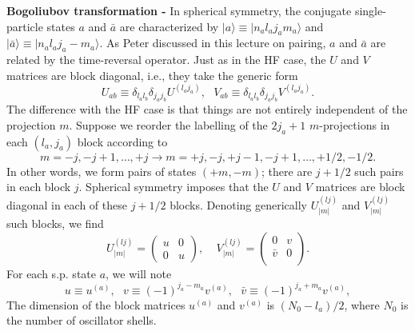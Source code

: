 {\bf Bogoliubov transformation - } In spherical symmetry, the conjugate 
single-particle states $a$ and $\bar{a}$ are characterized by 
$|a\rangle \equiv |n_{a} l_{a} j_{a} m_{a}\rangle$ and 
$|\bar{a}\rangle \equiv |n_{a} l_{a} j_{a} -m_{a}\rangle$. As Peter discussed 
in this lecture on pairing, $a$ and $\bar{a}$ are related by the time-reversal 
operator. Just as in the HF case, the $U$ and $V$ matrices are block diagonal, 
i.e., they take the generic form
\begin{equation}
U_{ab} \equiv \delta_{l_{a}l_{b}} \delta_{j_{a}j_{b}} U^{(l_{a}j_{a})}, 
\ \ \ 
V_{ab} \equiv \delta_{l_{a}l_{b}} \delta_{j_{a}j_{b}} V^{(l_{a}j_{a})}. 
\end{equation}
The difference with the HF case is that things are not entirely independent of 
the projection $m$. Suppose we reorder the labelling of the $2j_{a}+1$ 
$m$-projections in each $(l_{a},j_{a})$ block according to
\begin{equation}
m = -j, -j+1, \dots, +j \rightarrow m = +j,-j, +j-1, -j+1, \dots, +1/2, -1/2.
\end{equation}
In other words, we form pairs of states $(+m,-m)$; there are $j+1/2$ such 
pairs in each block $j$. Spherical symmetry imposes that the $U$ and $V$ 
matrices are block diagonal in each of these $j+1/2$ blocks. Denoting 
generically $U^{(lj)}_{|m|}$ and $V^{(lj)}_{|m|}$ such blocks, we find
\begin{equation}
U^{(lj)}_{|m|} =
\left(
\begin{array}{cc}
u & 0 \\
0 & u
\end{array}
\right),
\ \ \ \ \ 
V^{(lj)}_{|m|} =
\left(
\begin{array}{cc}
0 & v\\
\bar{v} & 0 \\
\end{array}
\right).
\end{equation}
For each s.p. state $a$, we will note
\begin{equation}
u \equiv u^{(a)}, 
\ \ \ 
v \equiv (-1)^{j_{a}-m_{a}} v^{(a)},
\ \ \ 
\bar{v} \equiv (-1)^{j_{a}+m_{a}} v^{(a)},
\end{equation}
The dimension of the block matrices $u^{(a)}$ and $v^{(a)}$ is 
$(N_{0} - l_{a})/2$, where $N_{0}$ is the 
number of oscillator shells.

